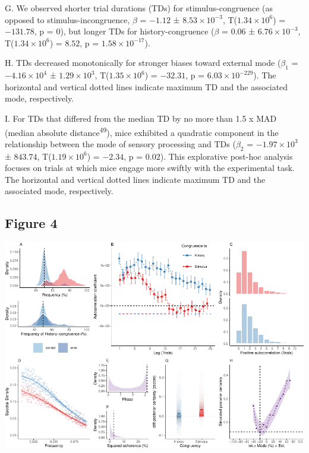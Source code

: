 \documentclass[
]{article}
\begin{document}
G. We observed shorter trial durations (TDs) for stimulus-congruence (as
opposed to stimulus-incongruence, \(\beta\) = \(-1.12\) ±
\(\ensuremath{8.53\times 10^{-3}}\),
T(\(\ensuremath{1.34\times 10^{6}}\)) = \(-131.78\), p = \(0\)), but
longer TDs for history-congruence (\(\beta\) = \(0.06\) ±
\(\ensuremath{6.76\times 10^{-3}}\),
T(\(\ensuremath{1.34\times 10^{6}}\)) = \(8.52\), p =
\(\ensuremath{1.58\times 10^{-17}}\)).

H. TDs decreased monotonically for stronger biases toward external mode
(\(\beta_1\) = \(\ensuremath{-4.16\times 10^{4}}\) ±
\(\ensuremath{1.29\times 10^{3}}\),
T(\(\ensuremath{1.35\times 10^{6}}\)) = \(-32.31\), p =
\(\ensuremath{6.03\times 10^{-229}}\)). The horizontal and vertical
dotted lines indicate maximum TD and the associated mode, respectively.

I. For TDs that differed from the median TD by no more than 1.5 x MAD
(median absolute distance\textsuperscript{49}), mice exhibited a
quadratic component in the relationship between the mode of sensory
processing and TDs (\(\beta_2\) = \(\ensuremath{-1.97\times 10^{3}}\) ±
\(843.74\), T(\(\ensuremath{1.19\times 10^{6}}\)) = \(-2.34\), p =
\(0.02\)). This explorative post-hoc analysis focuses on trials at which
mice engage more swiftly with the experimental task. The horizontal and
vertical dotted lines indicate maximum TD and the associated mode,
respectively.

\newpage

\hypertarget{figure-4}{%
\subsection{Figure 4}\label{figure-4}}

\includegraphics{modes_mouse_rev1b_files/figure-latex/Figure_4-1.pdf}
\end{document}
